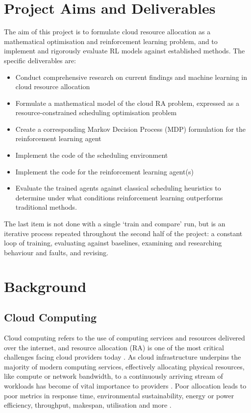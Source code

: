 \documentclass[12pt]{article}
\begin{document}
\section{Project Aims and Deliverables}
The aim of this project is to formulate cloud resource allocation as a mathematical optimisation and reinforcement learning problem, and to implement and rigorously evaluate RL models against established methods. The specific deliverables are:
\begin{itemize}
    \item Conduct comprehensive research on current findings and machine learning in cloud resource allocation
    \item Formulate a mathematical model of the cloud RA problem, expressed as a resource-constrained scheduling optimisation problem
    \item Create a corresponding Markov Decision Process (MDP) formulation for the reinforcement learning agent
    \item Implement the code of the scheduling environment
    \item Implement the code for the reinforcement learning agent(s)
    \item Evaluate the trained agents against classical scheduling heuristics to determine under what conditions reinforcement learning outperforms traditional methods.
\end{itemize}
The last item is not done with a single `train and compare' run, but is an iterative process repeated throughout the second half of the project: a constant loop of training, evaluating against baselines, examining and researching behaviour and faults, and revising.

\section{Background}
\subsection{Cloud Computing}
Cloud computing refers to the use of computing services and resources delivered over the internet, and resource allocation (RA) is one of the most critical challenges facing cloud providers today \cite{saidi2023, huawei2022}. As cloud infrastructure underpins the majority of modern computing services, effectively allocating physical resources, like compute or network bandwidth, to a continuously arriving stream of workloads has become of vital importance to providers \cite{sdn2021}. Poor allocation leads to poor metrics in response time, environmental sustainability, energy or power efficiency, throughput, makespan, utilisation and more \cite{cloudkpi2010, dvbpp2026, mohamaddiah2014, anuradha2014}.
\end{document}

